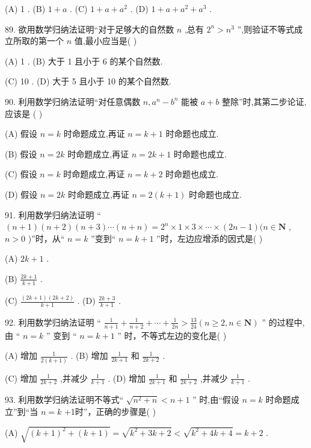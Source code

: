 \documentclass[10pt]{article}
\begin{document}
(A) 1 . (B) \(1 + a\) . (C) \(1 + a + {a}^{2}\) . (D) \(1 + a + {a}^{2} + {a}^{3}\) .

89. 欲用数学归纳法证明“对于足够大的自然数 \(n\) ,总有 \({2}^{n} > {n}^{3}\) ”,则验证不等式成立所取的第一个 \(n\) 值,最小应当是( )

(A) 1 . (B) 大于 1 且小于 6 的某个自然数.

(C) 10 . (D) 大于 5 且小于 10 的某个自然数.

90. 利用数学归纳法证明“对任意偶数 \(n,{a}^{n} - {b}^{n}\) 能被 \(a + b\) 整除”时,其第二步论证,应该是 ( )

(A) 假设 \(n = k\) 时命题成立,再证 \(n = k + 1\) 时命题也成立.

(B) 假设 \(n = {2k}\) 时命题成立,再证 \(n = {2k} + 1\) 时命题也成立.

(C) 假设 \(n = k\) 时命题成立,再证 \(n = k + 2\) 时命题也成立.

(D) 假设 \(n = {2k}\) 时命题成立,再证 \(n = 2\left( {k + 1}\right)\) 时命题也成立.

91. 利用数学归纳法证明 “ \(\left( {n + 1}\right) \left( {n + 2}\right) \left( {n + 3}\right) \cdots \left( {n + n}\right)  = {2}^{n} \times  1 \times  3 \times  \cdots  \times  \left( {{2n} - 1}\right) (n \in  \mathbf{N}\) , \(n > 0\) )”时，从“ \(n = k\) ”变到“ \(n = k + 1\) ”时，左边应增添的因式是( )

(A) \({2k} + 1\) .

(B) \(\frac{{2k} + 1}{k + 1}\) .

(C) \(\frac{\left( {{2k} + 1}\right) \left( {{2k} + 2}\right) }{k + 1}\) . (D) \(\frac{{2k} + 3}{k + 1}\) .

92. 利用数学归纳法证明 “ \(\frac{1}{n + 1} + \frac{1}{n + 2} + \cdots  + \frac{1}{2n} > \frac{13}{24}\left( {n \geq  2,n \in  \mathbf{N}}\right)\) ” 的过程中,由 “ \(n = k\) ” 变到 “ \(n = k + 1\) ” 时，不等式左边的变化是( )

(A) 增加 \(\frac{1}{2\left( {k + 1}\right) }\) . (B) 增加 \(\frac{1}{{2k} + 1}\) 和 \(\frac{1}{{2k} + 2}\) .

(C) 增加 \(\frac{1}{{2k} + 2}\) ,并减少 \(\frac{1}{k + 1}\) . (D) 增加 \(\frac{1}{{2k} + 1}\) 和 \(\frac{1}{{2k} + 2}\) ,并减少 \(\frac{1}{k + 1}\) .

93. 利用数学归纳法证明不等式“ \(\sqrt{{n}^{2} + n} < n + 1\) ” 时,由“假设 \(n = k\) 时命题成立”到“当 \(n = k\) +1时”，正确的步骤是( )

(A) \(\sqrt{{\left( k + 1\right) }^{2} + \left( {k + 1}\right) } = \sqrt{{k}^{2} + {3k} + 2} < \sqrt{{k}^{2} + {4k} + 4} = k + 2\) .
\end{document}
